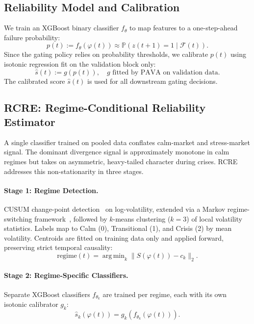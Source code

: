 \documentclass[sigconf]{acmart}
\begin{document}
\subsection{Reliability Model and Calibration}
We train an XGBoost binary classifier $f_{\theta}$ to map features to a one-step-ahead failure probability:
\begin{equation}
p(t) := f_{\theta}(\varphi(t)) \approx \mathbb{P}(z(t + 1) = 1 \mid \mathcal{F}(t)).
\end{equation}
Since the gating policy relies on probability thresholds, we calibrate $p(t)$ using isotonic regression fit on the validation block only:
\begin{equation}
\hat{s}(t) := g(p(t)), \quad g \text{ fitted by PAVA on validation data.}
\end{equation}
The calibrated score $\hat{s}(t)$ is used for all downstream gating decisions.

\subsection{RCRE: Regime-Conditional Reliability Estimator}
A single classifier trained on pooled data conflates calm-market and stress-market signal. The dominant divergence signal is approximately monotone in calm regimes but takes on asymmetric, heavy-tailed character during crises. RCRE addresses this non-stationarity in three stages.

\paragraph{Stage 1: Regime Detection.} CUSUM change-point detection~\cite{killick2012optimal} on log-volatility, extended via a Markov regime-switching framework~\cite{hamilton1989new}, followed by $k$-means clustering ($k = 3$) of local volatility statistics. Labels map to Calm (0), Transitional (1), and Crisis (2) by mean volatility. Centroids are fitted on training data only and applied forward, preserving strict temporal causality:
\begin{equation}
\text{regime}(t) = \operatorname{arg\,min}_k \| S(\varphi(t)) - c_k \|_2.
\end{equation}

\paragraph{Stage 2: Regime-Specific Classifiers.} Separate XGBoost classifiers $f_{\theta_k}$ are trained per regime, each with its own isotonic calibrator $g_k$:
\begin{equation}
\hat{s}_k(\varphi(t)) = g_k(f_{\theta_k}(\varphi(t))).
\end{equation}
\end{document}
